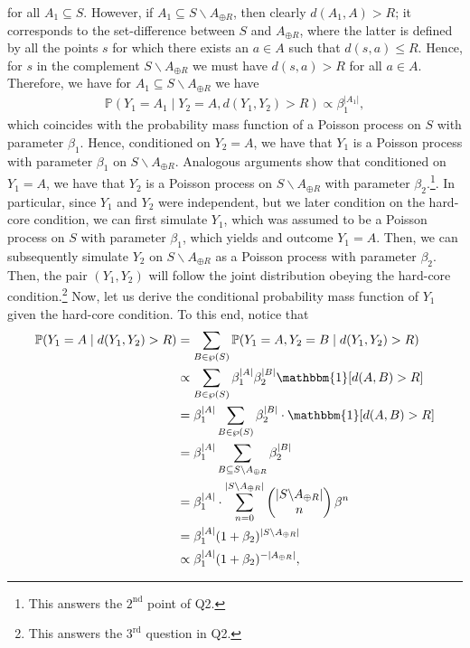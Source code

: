 \documentclass{article}
\begin{document}
for all $A_1 \subseteq S$. However, if $A_1 \subseteq  S \backslash A_{\oplus R}$, then clearly $d(A_1, A) > R$; it corresponds to the set-difference between $S$ and $A_{\oplus R}$, where the latter is defined by all the points $s$ for which there exists an $a \in A$ such that $d(s,a) \leq R$. Hence, for $s$ in the complement $S\backslash A_{\oplus R}$ we must have $d(s,a) > R$ for all $a \in A$. Therefore, we have for $A_1 \subseteq S \backslash A_{\oplus R}$ we have 
\begin{align*}
    \mathbb{P}(Y_1 = A_1 \mid Y_2 = A, d(Y_1, Y_2) > R) \propto \beta_1^{|A_1|},
\end{align*}
which coincides with the probability mass function of a Poisson process on $S$ with parameter $\beta_1$. Hence, conditioned on $Y_2 = A$, we have that $Y_1$ is a Poisson process with parameter $\beta_1$ on $S\backslash A_{\oplus R}$. Analogous arguments show that conditioned on $Y_1 = A$, we have that $Y_2$ is a Poisson process on $S\backslash A_{\oplus R}$ with parameter $\beta_2$.\footnote{This answers the $2^{\mathrm{nd}}$ point of Q2.}. \newline\newline 
In particular, since $Y_1$ and $Y_2$ were independent, but we later condition on the hard-core condition, we can first simulate $Y_1$, which was assumed to be a Poisson process on $S$ with parameter $\beta_1$, which yields and outcome $Y_1 = A$. Then, we can subsequently simulate $Y_2$ on $S\backslash A_{\oplus R}$ as a Poisson process with parameter $\beta_2$. Then, the pair $(Y_1, Y_2)$ will follow the joint distribution obeying the hard-core condition.\footnote{This answers the $3^{\mathrm{rd}}$ question in Q2.}\newline\newline
Now, let us derive the conditional probability mass function of $Y_1$ given the hard-core condition. To this end, notice that 
\begin{align*}
    \mathbb{P}(Y_1 = A \mid d(Y_1, Y_2) > R) &=  \sum_{B \in \wp(S)} \mathbb{P}(Y_1 = A, Y_2 = B \mid d(Y_1, Y_2) > R)\\
    &\propto \sum_{B \in \wp(S)} \beta_1^{|A|}\beta_2^{|B|}\mathbbm{1}[d(A,B) > R]\\
    &=\beta_1^{|A|} \sum_{B \in \wp(S)} \beta_2^{|B|} \cdot \mathbbm{1}[d(A,B) > R]\\
    &=\beta_1^{|A|} \sum_{B \subseteq S\backslash A_{\oplus R}} \beta_2^{|B|}\\
    &= \beta_1^{|A|} \cdot \sum_{n = 0}^{|S \backslash A_{\oplus R}|} \begin{pmatrix}
        |S \backslash A_{\oplus R}|\\
        n
    \end{pmatrix}\beta^n\\
    &= \beta_1^{|A|} (1+\beta_2)^{|S \backslash A_{\oplus R}|}\\
    &\propto\beta_1^{|A|} (1+\beta_2)^{-|A_{\oplus R}|},
\end{align*}
\end{document}
